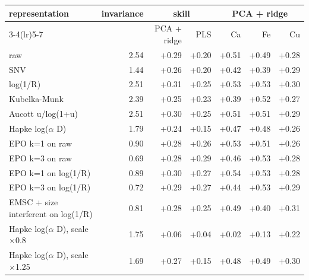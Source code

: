 \begin{tabular}{lrrrrrr}
\toprule
representation & invariance & \multicolumn{2}{c}{skill} & \multicolumn{3}{c}{PCA + ridge} \\ \cmidrule(lr){3-4}\cmidrule(lr){5-7}
& & PCA + ridge & PLS & Ca & Fe & Cu \\
\midrule
raw & 2.54 & +0.29 & +0.20 & +0.51 & +0.49 & +0.28 \\
SNV & 1.44 & +0.26 & +0.20 & +0.42 & +0.39 & +0.29 \\
log(1/R) & 2.51 & +0.31 & +0.25 & +0.53 & +0.53 & +0.30 \\
Kubelka-Munk & 2.39 & +0.25 & +0.23 & +0.39 & +0.52 & +0.27 \\
Aucott u/log(1+u) & 2.51 & +0.30 & +0.25 & +0.51 & +0.51 & +0.29 \\
Hapke log($\alpha$ D) & 1.79 & +0.24 & +0.15 & +0.47 & +0.48 & +0.26 \\
EPO k=1 on raw & 0.90 & +0.28 & +0.26 & +0.53 & +0.51 & +0.26 \\
EPO k=3 on raw & 0.69 & +0.28 & +0.29 & +0.46 & +0.53 & +0.28 \\
EPO k=1 on log(1/R) & 0.89 & +0.30 & +0.27 & +0.54 & +0.53 & +0.28 \\
EPO k=3 on log(1/R) & 0.72 & +0.29 & +0.27 & +0.44 & +0.53 & +0.29 \\
EMSC + size interferent on log(1/R) & 0.81 & +0.28 & +0.25 & +0.49 & +0.40 & +0.31 \\
Hapke log($\alpha$ D), scale $\times$0.8 & 1.75 & +0.06 & +0.04 & +0.02 & +0.13 & +0.22 \\
Hapke log($\alpha$ D), scale $\times$1.25 & 1.69 & +0.27 & +0.15 & +0.48 & +0.49 & +0.30 \\
\bottomrule
\end{tabular}
